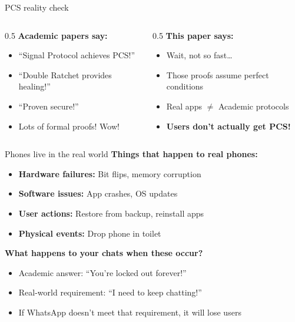 \ifdefined\PRESENTATION\else\PassOptionsToClass{handout}{beamer}\fi\documentclass[aspectratio=169, lualatex]{beamer}
\begin{document}
\begin{frame}{PCS reality check}
	\begin{columns}[c]
		\begin{column}{0.5\textwidth}
			\textbf{Academic papers say:}
			\begin{itemize}
				\item ``Signal Protocol achieves PCS!''
				\item ``Double Ratchet provides healing!''
				\item ``Proven secure!''
				\item Lots of formal proofs! Wow!
			\end{itemize}
		\end{column}
		\begin{column}{0.5\textwidth}
			\textbf{This paper says:}
			\begin{itemize}
				\item Wait, not so fast\ldots
				\item Those proofs assume perfect conditions
				\item Real apps $\neq$ Academic protocols
				\item \textbf{Users don't actually get PCS!}
			\end{itemize}
		\end{column}
	\end{columns}
\end{frame}

\begin{frame}{Phones live in the real world}
	\textbf{Things that happen to real phones:}
	\begin{itemize}
		\item \textbf{Hardware failures:} Bit flips, memory corruption
		\item \textbf{Software issues:} App crashes, OS updates
		\item \textbf{User actions:} Restore from backup, reinstall apps
		\item \textbf{Physical events:} Drop phone in toilet
	\end{itemize}
	\textbf{What happens to your chats when these occur?}
	\begin{itemize}
		\item Academic answer: ``You're locked out forever!''
		\item Real-world requirement: ``I need to keep chatting!''
		\item If WhatsApp doesn't meet that requirement, it will lose users
	\end{itemize}
\end{frame}
\end{document}
